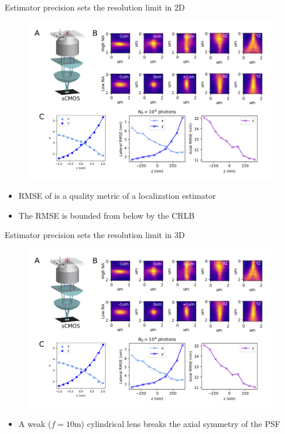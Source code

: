 \documentclass{beamer}					%
\begin{document}
\begin{frame}{Estimator precision sets the resolution limit in 2D}
\begin{figure}
\includegraphics[width=11cm]{Astigmatism.png}
\end{figure}
\begin{itemize}
\item RMSE of is a quality metric of a localization estimator
\item The RMSE is bounded from below by the CRLB
\end{itemize}
\end{frame}


\begin{frame}{Estimator precision sets the resolution limit in 3D}
\begin{figure}
\includegraphics[width=11cm]{Astigmatism.png}
\end{figure}
\begin{itemize}
\item A weak ($f=10$m) cylindrical lens breaks the axial symmetry of the PSF
\end{itemize}
\end{frame}
\end{document}

